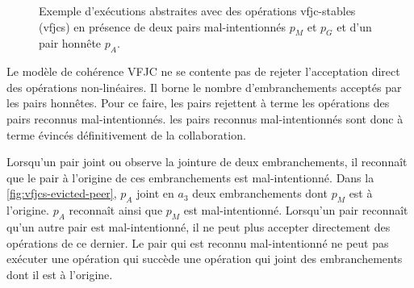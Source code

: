 \begin{figure}[htb]
\centering
{}
\caption[Stabilité \acl{VFJC} en présence de deux pairs mal-intentionnés]{Exemple d'exécutions abstraites avec des opérations vfjc-stables (vfjcs) en présence de deux pairs mal-intentionnés $p_M$ et $p_G$ et d'un pair honnête $p_A$.}
\label{fig:vfjcs-two-malicious}
\end{figure}

Le modèle de cohérence \acl{VFJC} ne se contente pas de rejeter l'acceptation direct des opérations non-linéaires.
Il borne le nombre d'embranchements acceptés par les pairs honnêtes.
Pour ce faire, les pairs rejettent à terme les opérations des pairs reconnus mal-intentionnés.
les pairs reconnus mal-intentionnés sont donc à terme évincés définitivement de la collaboration.

Lorsqu'un pair joint ou observe la jointure de deux embranchements, il reconnaît que le pair à l'origine de ces embranchements est mal-intentionné.
Dans la \autoref{fig:vfjcs-evicted-peer}, $p_A$ joint en $a_3$ deux embranchements dont $p_M$ est à l'origine.
$p_A$ reconnaît ainsi que $p_M$ est mal-intentionné.
Lorsqu'un pair reconnaît qu'un autre pair est mal-intentionné, il ne peut plus accepter directement des opérations de ce dernier.
Le pair qui est reconnu mal-intentionné ne peut pas exécuter une opération qui succède une opération qui joint des embranchements dont il est à l'origine.

